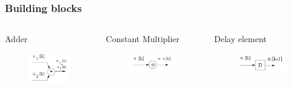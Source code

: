 \begin{frame}
	\frametitle{Building blocks}
	\begin{columns}
		\begin{column}{0.33\textwidth}
			\begin{block}{Adder}
				\begin{figure}
				\centering
				\includegraphics[width=0.7\linewidth]{Images/discrete_time_systems_15}
				\label{fig:discrete_time_systems_15}
			\end{figure}

			\end{block}
		\end{column}
		\begin{column}{0.33\textwidth}
				\begin{block}{Constant Multiplier}
					\begin{figure}
					\centering
					\includegraphics[width=0.7\linewidth]{Images/discrete_time_systems_16}
					\label{fig:discrete_time_systems_16}
					\end{figure}

				\end{block}
		\end{column}
		\begin{column}{0.33\textwidth}
			\begin{block}{Delay element}
\begin{figure}
\centering
\includegraphics[width=0.7\linewidth]{Images/discrete_time_systems_17}
\caption{}
\label{fig:discrete_time_systems_17}
\end{figure}
			\end{block}
		\end{column}
	\end{columns}
\end{frame}
